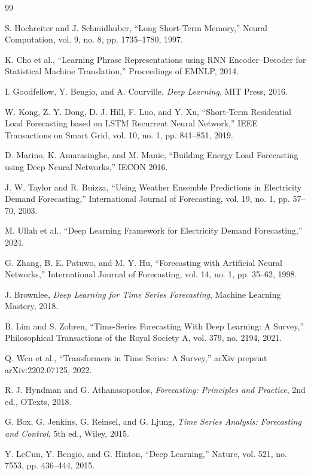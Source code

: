 \documentclass[12pt]{report}
\begin{document}
\begin{thebibliography}{99}

S. Hochreiter and J. Schmidhuber,
``Long Short-Term Memory,''
Neural Computation, vol. 9, no. 8, pp. 1735--1780, 1997.

K. Cho et al.,
``Learning Phrase Representations using RNN Encoder--Decoder for Statistical Machine Translation,''
Proceedings of EMNLP, 2014.

I. Goodfellow, Y. Bengio, and A. Courville,
\textit{Deep Learning},
MIT Press, 2016.

W. Kong, Z. Y. Dong, D. J. Hill, F. Luo, and Y. Xu,
``Short-Term Residential Load Forecasting based on LSTM Recurrent Neural Network,''
IEEE Transactions on Smart Grid, vol. 10, no. 1, pp. 841--851, 2019.

D. Marino, K. Amarasinghe, and M. Manic,
``Building Energy Load Forecasting using Deep Neural Networks,''
IECON 2016.

J. W. Taylor and R. Buizza,
``Using Weather Ensemble Predictions in Electricity Demand Forecasting,''
International Journal of Forecasting, vol. 19, no. 1, pp. 57--70, 2003.

M. Ullah et al.,
``Deep Learning Framework for Electricity Demand Forecasting,''
2024.

G. Zhang, B. E. Patuwo, and M. Y. Hu,
``Forecasting with Artificial Neural Networks,''
International Journal of Forecasting, vol. 14, no. 1, pp. 35--62, 1998.

J. Brownlee,
\textit{Deep Learning for Time Series Forecasting},
Machine Learning Mastery, 2018.

B. Lim and S. Zohren,
``Time-Series Forecasting With Deep Learning: A Survey,''
Philosophical Transactions of the Royal Society A, vol. 379, no. 2194, 2021.

Q. Wen et al.,
``Transformers in Time Series: A Survey,''
arXiv preprint arXiv:2202.07125, 2022.

R. J. Hyndman and G. Athanasopoulos,
\textit{Forecasting: Principles and Practice},
2nd ed., OTexts, 2018.

G. Box, G. Jenkins, G. Reinsel, and G. Ljung,
\textit{Time Series Analysis: Forecasting and Control},
5th ed., Wiley, 2015.

Y. LeCun, Y. Bengio, and G. Hinton,
``Deep Learning,''
Nature, vol. 521, no. 7553, pp. 436--444, 2015.


\end{thebibliography}
\end{document}
